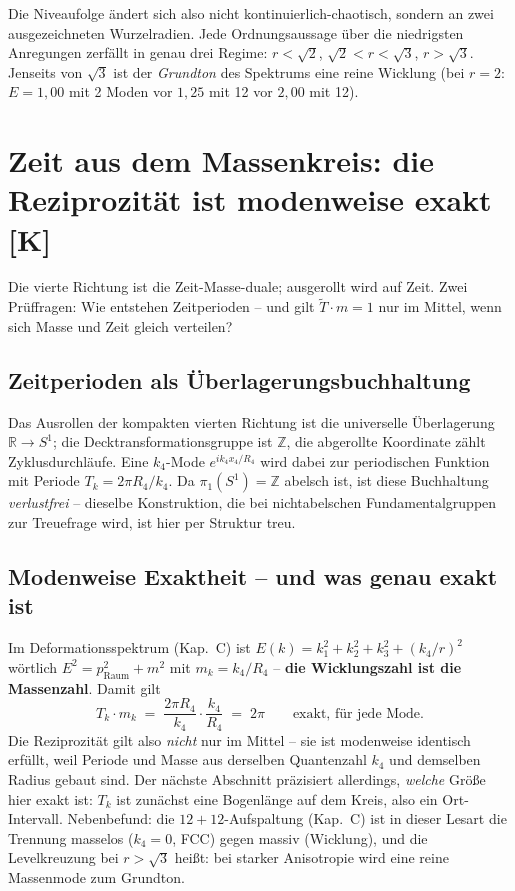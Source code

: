Die Niveaufolge ändert sich also nicht kontinuierlich-chaotisch,
sondern an zwei ausgezeichneten Wurzelradien. Jede Ordnungsaussage
über die niedrigsten Anregungen zerfällt in genau drei Regime:
$r < \sqrt2$, $\sqrt2 < r < \sqrt3$, $r > \sqrt3$. Jenseits von
$\sqrt3$ ist der \emph{Grundton} des Spektrums eine reine Wicklung
(bei $r = 2$: $E = 1{,}00$ mit 2 Moden vor $1{,}25$ mit 12 vor
$2{,}00$ mit 12).

\chapter{Zeit aus dem Massenkreis: die Reziprozität ist modenweise exakt [K]}

Die vierte Richtung ist die Zeit-Masse-duale; ausgerollt wird auf
Zeit. Zwei Prüffragen: Wie entstehen Zeitperioden -- und gilt
$\tilde T\cdot m = 1$ nur im Mittel, wenn sich Masse und Zeit
gleich verteilen?

\section{Zeitperioden als Überlagerungsbuchhaltung}

Das Ausrollen der kompakten vierten Richtung ist die universelle
Überlagerung $\mathbb{R}\to S^1$; die Decktransformationsgruppe
ist $\mathbb{Z}$, die abgerollte Koordinate zählt
Zyklusdurchläufe. Eine $k_4$-Mode $e^{ik_4x_4/R_4}$ wird dabei
zur periodischen Funktion mit Periode $T_k = 2\pi R_4/k_4$. Da
$\pi_1(S^1) = \mathbb{Z}$ abelsch ist, ist diese Buchhaltung
\emph{verlustfrei} -- dieselbe Konstruktion, die bei
nichtabelschen Fundamentalgruppen zur Treuefrage wird, ist hier
per Struktur treu.

\section{Modenweise Exaktheit -- und was genau exakt ist}

Im Deformationsspektrum (Kap.~C) ist
$E(k) = k_1^2+k_2^2+k_3^2 + (k_4/r)^2$ wörtlich
$E^2 = p_\text{Raum}^2 + m^2$ mit $m_k = k_4/R_4$ -- \textbf{die
Wicklungszahl ist die Massenzahl}. Damit gilt
\begin{equation}
  T_k \cdot m_k \;=\; \frac{2\pi R_4}{k_4}\cdot\frac{k_4}{R_4}
  \;=\; 2\pi
  \qquad\text{exakt, für jede Mode.}
\end{equation}
Die Reziprozität gilt also \emph{nicht} nur im Mittel -- sie ist
modenweise identisch erfüllt, weil Periode und Masse aus derselben
Quantenzahl $k_4$ und demselben Radius gebaut sind. Der nächste
Abschnitt präzisiert allerdings, \emph{welche} Größe hier exakt
ist: $T_k$ ist zunächst eine Bogenlänge auf dem Kreis, also ein
Ort-Intervall. Nebenbefund:
die $12+12$-Aufspaltung (Kap.~C) ist in dieser Lesart die
Trennung masselos ($k_4 = 0$, FCC) gegen massiv (Wicklung), und
die Levelkreuzung bei $r > \sqrt3$ heißt: bei starker Anisotropie
wird eine reine Massenmode zum Grundton.

